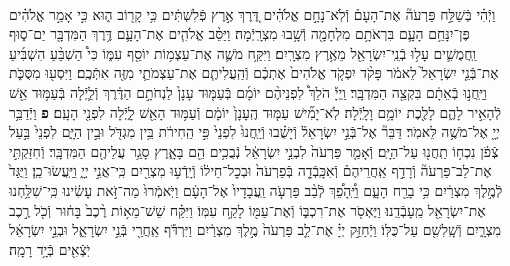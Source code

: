 \documentclass[twoside, openany, parskip=half, 11pt]{book}
\begin{document}
\begin{footnotesize}
\begin{multicols}{2}
\\
וַיְֿהִ֗י בְּֿשַׁלַּ֣ח פַּרְעֹה֘ אֶת־הָעָם֒ וְֿלֹֽא־נָחָ֣ם אֱלֹהִ֗ים דֶּ֚רֶךְ אֶ֣רֶץ פְּֿלִשְׁתִּ֔ים כִּ֥י קָר֖וֹב ה֑וּא כִּ֣י אָמַ֣ר אֱלֹהִ֗ים פֶּן־יִנָּחֵ֥ם הָעָ֛ם בִּרְאֹתָ֥ם מִלְחָמָ֖ה וְֿשָׁ֥בוּ מִצְרָֽיְֿמָה׃ וַיַּסֵּ֨ב אֱלֹהִ֧ים אֶת־הָעָ֛ם דֶּ֥רֶךְ הַמִּדְבָּ֖ר יַם־ס֑וּף וַֽחֲמֻשִׁ֛ים עָל֥וּ בְֿנֵֽי־יִשְׂרָאֵ֖ל מֵאֶ֥רֶץ מִצְרָֽיִם׃ וַיִּקַּ֥ח מֹשֶׁ֛ה אֶת־עַצְמ֥וֹת יוֹסֵ֖ף עִמּ֑וֹ כִּי֩ הַשְׁבֵּ֨עַ הִשְׁבִּ֜יעַ אֶת־בְּֿנֵ֤י יִשְׂרָאֵל֙ לֵאמֹ֔ר פָּקֹ֨ד יִפְקֹ֤ד אֱלֹהִים֙ אֶתְכֶ֔ם וְֿהַֽעֲלִיתֶ֧ם אֶת־עַצְמֹתַ֛י מִזֶּ֖ה אִתְּֿכֶֽם׃
וַיִּסְע֖וּ מִסֻּכֹּ֑ת וַיַּֽחֲנ֣וּ בְֿאֵתָ֔ם בִּקְצֵ֖ה הַמִּדְבָּֽר׃ וַֽיְיָ֡ הֹלֵךְ֩ לִפְנֵיהֶ֨ם יוֹמָ֜ם בְּֿעַמּ֤וּד עָנָן֙ לַנְחֹתָ֣ם הַדֶּ֔רֶךְ וְֿלַ֛יְֿלָה בְּֿעַמּ֥וּד אֵ֖שׁ לְֿהָאִ֣יר לָהֶ֑ם לָלֶ֖כֶת יוֹמָ֥ם וָלָֽיְֿלָה׃ לֹֽא־יָמִ֞ישׁ עַמּ֤וּד הֶֽעָנָן֙ יוֹמָ֔ם וְֿעַמּ֥וּד הָאֵ֖שׁ לָ֑יְֿלָה לִפְנֵ֖י הָעָֽם׃ \textbf{פ}
וַיְֿדַבֵּ֥ר יְיָ֖ אֶל־מֹשֶׁ֥ה לֵּאמֹֽר׃ דַּבֵּר֘ אֶל־בְּֿנֵ֣י יִשְׂרָאֵל֒ וְֿיָשֻׁ֗בוּ וְֿיַֽחֲנוּ֙ לִפְנֵי֙ פִּ֣י הַֽחִירֹ֔ת בֵּ֥ין מִגְדֹּ֖ל וּבֵ֣ין הַיָּ֑ם לִפְנֵי֙ בַּ֣עַל צְֿפֹ֔ן נִכְח֥וֹ תַֽחֲנ֖וּ עַל־הַיָּֽם׃ וְֿאָמַ֤ר פַּרְעֹה֙ לִבְנֵ֣י יִשְׂרָאֵ֔ל נְֿבֻכִ֥ים הֵ֖ם בָּאָ֑רֶץ סָגַ֥ר עֲלֵיהֶ֖ם הַמִּדְבָּֽר׃ וְֿחִזַּקְתִּ֣י אֶת־לֵב־פַּרְעֹה֘ וְֿרָדַ֣ף אַֽחֲרֵיהֶם֒ וְֿאִכָּֽבְֿדָ֤ה בְּֿפַרְעֹה֙ וּבְכׇל־חֵיל֔וֹ וְֿיָֽדְֿע֥וּ מִצְרַ֖יִם כִּֽי־אֲנִ֣י יְיָ֑ וַיַּֽעֲשׂוּ־כֵֽן׃
וַיֻּגַּד֙ לְֿמֶ֣לֶךְ מִצְרַ֔יִם כִּ֥י בָרַ֖ח הָעָ֑ם וַיֵּֽ֠הָפֵ֠ךְ לְֿבַ֨ב פַּרְעֹ֤ה וַֽעֲבָדָיו֙ אֶל־הָעָ֔ם וַיֹּֽאמְֿרוּ֙ מַה־זֹּ֣את עָשִׂ֔ינוּ כִּֽי־שִׁלַּ֥חְנוּ אֶת־יִשְׂרָאֵ֖ל מֵֽעָבְֿדֵֽנוּ׃ וַיֶּאְסֹ֖ר אֶת־רִכְבּ֑וֹ וְֿאֶת־עַמּ֖וֹ לָקַ֥ח עִמּֽוֹ׃ וַיִּקַּ֗ח שֵׁשׁ־מֵא֥וֹת רֶ֨כֶב֙ בָּח֔וּר וְֿכֹ֖ל רֶ֣כֶב מִצְרָ֑יִם וְֿשָֽׁלִשִׁ֖ם עַל־כֻּלּֽוֹ׃ וַיְֿחַזֵּ֣ק יְיָ֗ אֶת־לֵ֤ב פַּרְעֹה֙ מֶ֣לֶךְ מִצְרַ֔יִם וַיִּרְדֹּ֕ף אַֽחֲרֵ֖י בְּֿנֵ֣י יִשְׂרָאֵ֑ל וּבְנֵ֣י יִשְׂרָאֵ֔ל יֹֽצְֿאִ֖ים בְּֿיָ֥ד רָמָֽה׃


\end{multicols}
\end{footnotesize}
\end{document}

